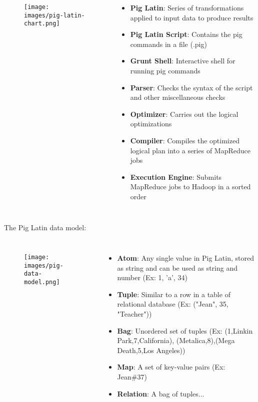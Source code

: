 \documentclass{beamer}[10pt, usepdftitle=false handout]
\begin{document}
\begin{frame}

\begin{columns}[c]
\begin{figure}
\texttt{[image: images/pig-latin-chart.png]} 
\end{figure}	

\begin{itemize}
\item{\textbf{Pig Latin}: Series of transformations applied to input data to produce results}
\item{\textbf{Pig Latin Script}: Contains the pig commands in a file (.pig)}
\item{\textbf{Grunt Shell}: Interactive shell for running pig commands}
\item{\textbf{Parser}: Checks the syntax of the script and other miscellaneous checks}
\item{\textbf{Optimizer}: Carries out the logical optimizations}
\item{\textbf{Compiler}: Compiles the optimized logical plan into a series of MapReduce jobs}
\item{\textbf{Execution Engine}: Submits MapReduce jobs to Hadoop in a sorted order}
\end{itemize}



\end{columns}
	

\end{frame}
\begin{frame}
The Pig Latin data model:
\vspace*{0.6em}

\begin{columns}[c]

\begin{figure}
\texttt{[image: images/pig-data-model.png]} 
\end{figure}	

\begin{itemize}
\item{\textbf{Atom}: Any single value in Pig Latin, stored as string and can be used as string and number (Ex: 1, 'a', 34)}
\item{\textbf{Tuple}: Similar to a row in a table of relational database (Ex: ("Jean", 35, "Teacher"))}
\item{\textbf{Bag}: Unordered set of tuples (Ex: {(1,Linkin Park,7,California), (Metalica,8),(Mega Death,5,Los Angeles)})}
\item{\textbf{Map}: A set of key-value pairs (Ex: Jean\#37)}
\item{\textbf{Relation}: A bag of tuples...}
\end{itemize}

\end{columns}


\end{frame}
\end{document}
